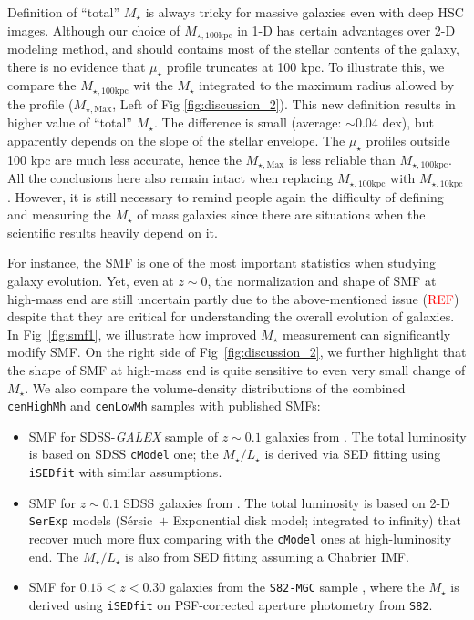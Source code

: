 \documentclass{emulateapj}
\def\ser{{S\'{e}rsic\ }}
\def\cmodel{\texttt{cModel}}
\def\rbcg{\texttt{cenHighMh}}
\def\nbcg{\texttt{cenLowMh}}
\def\mstar{{$M_{\star}$}}
\def\minn{{$M_{\star,10\mathrm{kpc}}$}}
\def\mtot{{$M_{\star,100\mathrm{kpc}}$}}
\def\mmax{{$M_{\star,\mathrm{Max}}$}}
\def\m2l{{$M_{\star}/L_{\star}$}}
\def\mden{{$\mu_{\star}$}}
\newcommand{\addref}{{\textcolor{red}{REF}}}
\begin{document}
\begin{CJK*}{UTF8}{gbsn}
    Definition of ``total'' \mstar{} is always tricky for massive galaxies even 
    with deep HSC images.
    Although our choice of \mtot{} in 1-D has certain advantages over 2-D modeling 
    method, and should contains most of the stellar contents of the galaxy, there
    is no evidence that \mden{} profile truncates at 100 kpc. 
    To illustrate this, we compare the \mtot{} wit the \mstar{} integrated  
    to the maximum radius allowed by the profile (\mmax{}, Left of Fig 
    \ref{fig:discussion_2}). 
    This new definition results in higher value of ``total'' \mstar{}.
    The difference is small (average: $\sim 0.04$ dex), but apparently depends on 
    the slope of the stellar envelope. 
    The \mden{} profiles outside 100 kpc are much less accurate, hence the \mmax{} 
    is less reliable than \mtot{}. 
    All the conclusions here also remain intact when replacing \mtot{} with 
    \minn{}.  
    However, it is still necessary to remind people again the difficulty of 
    defining and measuring the \mstar{} of mass galaxies since there are 
    situations when the scientific results heavily depend on it. 
    
    For instance, the SMF is one of the most important statistics when studying 
    galaxy evolution. 
    Yet, even at $z\sim 0$, the normalization and shape of SMF at high-mass end 
    are still uncertain partly due to the above-mentioned issue (\addref{}) 
    despite that they are critical for understanding the overall evolution of 
    galaxies. 
    In Fig~\ref{fig:smf1}, we illustrate how improved \mstar{} measurement can 
    significantly modify SMF.  
    On the right side of Fig~\ref{fig:discussion_2}, we further highlight that 
    the shape of SMF at high-mass end is quite sensitive to even very small 
    change of \mstar{}.
    We also compare the volume-density distributions of the combined \rbcg{} and 
    \nbcg{} samples with published SMFs:  
    
    \begin{itemize}
        \item SMF for SDSS-\textit{GALEX} sample of $z\sim 0.1$ galaxies from 
            \citet{Moustakas13}. 
            The total luminosity is based on SDSS \cmodel{} one; the \m2l{} is 
            derived via SED fitting using \texttt{iSEDfit} with similar 
            assumptions.
        \item SMF for $z\sim 0.1$ SDSS galaxies from \citet{Bernardi2013}. 
            The total luminosity is based on 2-D \texttt{SerExp} models 
            (\ser{}$+$ Exponential disk model; integrated to infinity) that 
            recover much more flux comparing with the \cmodel{} ones at 
            high-luminosity end. 
            The \m2l{} is also from SED fitting assuming a Chabrier IMF.
        \item SMF for $0.15 < z < 0.30$ galaxies from the \texttt{S82-MGC} sample
            \citep{Leauthaud2016}, where the \mstar{} is derived using 
            \texttt{iSEDfit} on PSF-corrected aperture photometry from 
            \texttt{S82}.
    \end{itemize}


\end{CJK*}
\end{document}
